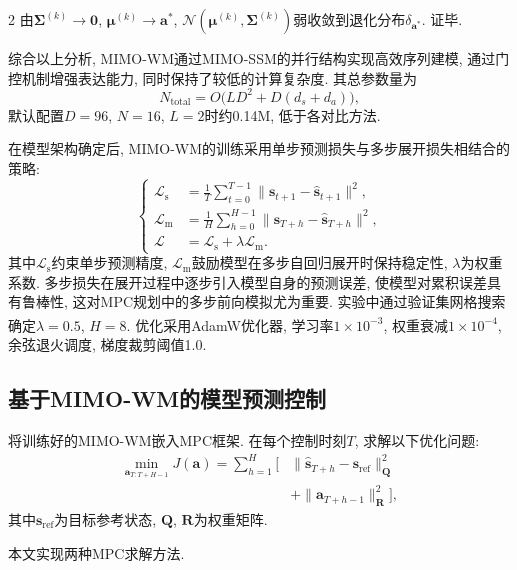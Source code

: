 \begin{multicols}{2}
由${\bm \Sigma}^{(k)} \to {\bm 0}$, ${\bm \mu}^{(k)} \to {\bm a}^*$,
$\mathcal{N}({\bm \mu}^{(k)}, {\bm \Sigma}^{(k)})$弱收敛到退化分布$\delta_{{\bm a}^*}$.
证毕.

综合以上分析, MIMO-WM通过MIMO-SSM的并行结构实现高效序列建模, 通过门控机制增强表达能力, 同时保持了较低的计算复杂度. 其总参数量为
\begin{equation}
N_{\text{total}} = O\big(LD^2 + D(d_s+d_a)\big),
\end{equation}
默认配置$D=96$, $N=16$, $L=2$时约0.14M, 低于各对比方法.

在模型架构确定后, MIMO-WM的训练采用单步预测损失与多步展开损失相结合的策略:
\begin{equation}
\left\{\begin{aligned}
\mathcal{L}_{\text{s}} &= \frac{1}{T}\sum_{t=0}^{T-1}\|{\bm s}_{t+1} - \hat{{\bm s}}_{t+1}\|^2, \\
\mathcal{L}_{\text{m}} &= \frac{1}{H}\sum_{h=0}^{H-1}\|{\bm s}_{T+h} - \hat{{\bm s}}_{T+h}\|^2, \\
\mathcal{L} &= \mathcal{L}_{\text{s}} + \lambda \mathcal{L}_{\text{m}}.
\end{aligned}\right.
\end{equation}
其中$\mathcal{L}_{\text{s}}$约束单步预测精度, $\mathcal{L}_{\text{m}}$鼓励模型在多步自回归展开时保持稳定性, $\lambda$为权重系数.
多步损失在展开过程中逐步引入模型自身的预测误差, 使模型对累积误差具有鲁棒性, 这对MPC规划中的多步前向模拟尤为重要.
实验中通过验证集网格搜索确定$\lambda=0.5$, $H=8$.
优化采用AdamW优化器\textsuperscript{\cite{27}}, 学习率$1\times10^{-3}$, 权重衰减$1\times10^{-4}$, 余弦退火调度, 梯度裁剪阈值1.0.

\subsection{基于MIMO-WM的模型预测控制}

将训练好的MIMO-WM嵌入MPC框架. 在每个控制时刻$T$,
求解以下优化问题:
\begin{equation}
\label{eq:mpc}
\begin{aligned}
\min_{{\bm a}_{T:T+H-1}} J({\bm a}) = \sum_{h=1}^{H}\Big[ &\|\hat{{\bm s}}_{T+h} - {\bm s}_{\text{ref}}\|_{{\bm Q}}^2 \\
&+ \|{\bm a}_{T+h-1}\|_{{\bm R}}^2\Big],
\end{aligned}
\end{equation}
其中${\bm s}_{\text{ref}}$为目标参考状态, ${\bm Q}$, ${\bm R}$为权重矩阵.

本文实现两种MPC求解方法.


\end{multicols}
